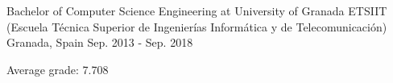 

\begin{cventries}

  \cventry
    {Bachelor of Computer Science Engineering at University of Granada} %
    {ETSIIT (Escuela Técnica Superior de Ingenierías Informática y de Telecomunicación)} %
    {Granada, Spain} %
    {Sep. 2013 - Sep. 2018} %
    {
      \begin{cvitems} %
        \item {Average grade: 7.708}
      \end{cvitems}
    }

\end{cventries}
